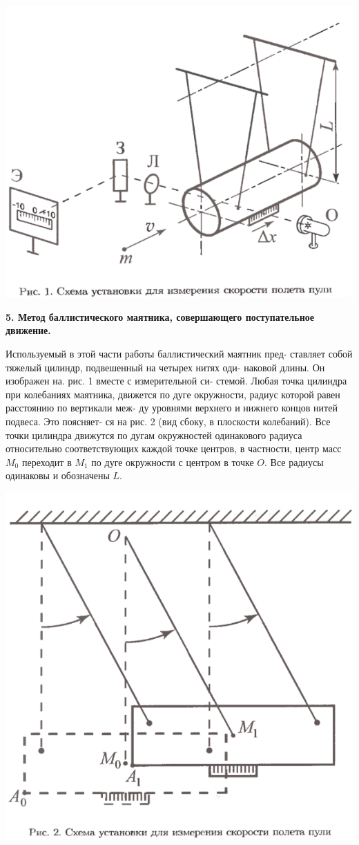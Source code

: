 \documentclass[a4paper,12pt]{article} %
\begin{document}
\includegraphics[width=\textwidth]{1.2.1 1}

\begin{center}
{\bf 5. Метод баллистического маятника, совершающего
поступательное движение.}
\end{center}

Используемый в этой части работы баллистический маятник пред-
ставляет собой тяжелый цилиндр, подвешенный на четырех нитях оди-
наковой длины. Он изображен на. рис. 1 вместе с измерительной си-
стемой. Любая точка цилиндра при колебаниях маятника, движется по
дуге окружности, радиус которой равен расстоянию по вертикали меж-
ду уровнями верхнего и нижнего концов нитей подвеса. Это поясняет-
ся на рис. 2 (вид сбоку, в плоскости колебаний). Все точки цилиндра
движутся по дугам окружностей одинакового радиуса относительно
соответствующих каждой точке центров, в частности, центр масс $M_0$
переходит в $M_1$ по дуге окружности с центром в точке $O$. Все радиусы
одинаковы и обозначены $L$.

\includegraphics[width=\textwidth]{1.2.1 2}
\end{document}

